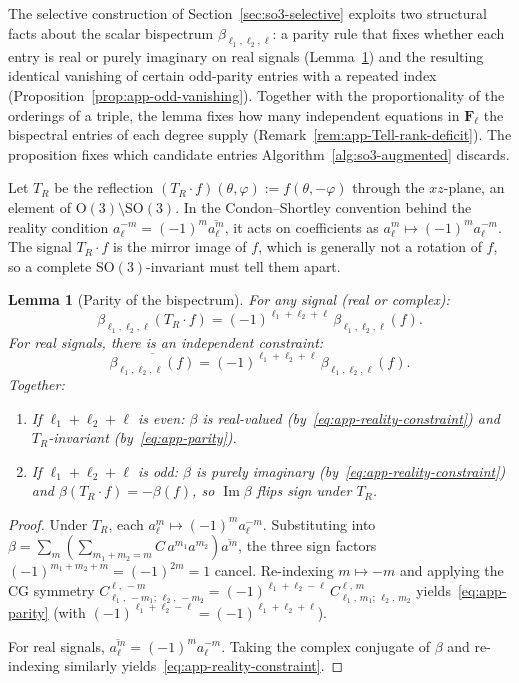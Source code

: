 \documentclass{article}
\newtheorem{lemma}[theorem]{Lemma}
\theoremstyle{definition}
\theoremstyle{remark}
\DeclareMathOperator{\im}{Im}
\newcommand{\SO}{\mathrm{SO}}
\newcommand{\CG}[6]{C^{#5,\,#6}_{#1,\,#2;\,#3,\,#4}}
\newcommand{\conj}[1]{\overline{#1}}
\theoremstyle{definition}
\begin{document}
The selective construction of Section~\ref{sec:so3-selective}
exploits two structural facts about the scalar bispectrum
$\beta_{\ell_1,\ell_2,\ell}$: a parity rule that fixes whether each
entry is real or purely imaginary on real signals (Lemma~\ref{lem:app-parity})
and the resulting identical vanishing of certain odd-parity entries
with a repeated index (Proposition~\ref{prop:app-odd-vanishing}). Together with the
proportionality of the orderings of a triple, the lemma fixes how many independent equations
in $\mathbf{F}_\ell$ the bispectral entries of each degree supply (Remark~\ref{rem:app-Tell-rank-deficit}). The
proposition fixes which candidate entries Algorithm~\ref{alg:so3-augmented} discards.

Let $T_R$ be the reflection $(T_R\cdot f)(\theta,\varphi) :=
f(\theta,-\varphi)$ through the $xz$-plane, an element of
$\mathrm{O}(3)\setminus\SO(3)$. In the Condon--Shortley convention
behind the reality condition
$a_\ell^{-m}=(-1)^m\conj{a_\ell^m}$, it acts on coefficients as
$a_\ell^m\mapsto(-1)^m a_\ell^{-m}$. The signal $T_R\cdot f$ is the mirror image of $f$, which is
generally not a rotation of $f$, so a complete $\SO(3)$-invariant must tell them apart.

\begin{lemma}[Parity of the bispectrum]\label{lem:app-parity}
For any signal (real or complex):
\begin{equation}\label{eq:app-parity}
  \beta_{\ell_1,\ell_2,\ell}(T_R \cdot f)
  = (-1)^{\ell_1+\ell_2+\ell}\,\beta_{\ell_1,\ell_2,\ell}(f).
\end{equation}
For \emph{real} signals, there is an independent constraint:
\begin{equation}\label{eq:app-reality-constraint}
  \conj{\beta_{\ell_1,\ell_2,\ell}(f)}
  = (-1)^{\ell_1+\ell_2+\ell}\,\beta_{\ell_1,\ell_2,\ell}(f).
\end{equation}
Together:
\begin{enumerate}[nosep,label=(\alph*)]
\item If $\ell_1+\ell_2+\ell$ is even:
  $\beta$ is real-valued (by~\eqref{eq:app-reality-constraint})
  and $T_R$-invariant (by~\eqref{eq:app-parity}).
\item If $\ell_1+\ell_2+\ell$ is odd:
  $\beta$ is purely imaginary (by~\eqref{eq:app-reality-constraint})
  and $\beta(T_R \cdot f) = -\beta(f)$, so $\im\beta$ flips sign under $T_R$.
\end{enumerate}
\end{lemma}
\begin{proof}
Under $T_R$, each $a_\ell^m \mapsto (-1)^m a_\ell^{-m}$.
Substituting into $\beta = \sum_m (\sum_{m_1+m_2=m} C\, a^{m_1} a^{m_2})
\conj{a^m}$, the three sign factors $(-1)^{m_1+m_2+m} = (-1)^{2m} = 1$
cancel. Re-indexing $m \mapsto -m$ and applying the CG symmetry
$\CG{\ell_1}{-m_1}{\ell_2}{-m_2}{\ell}{-m}
  = (-1)^{\ell_1+\ell_2-\ell}\,\CG{\ell_1}{m_1}{\ell_2}{m_2}{\ell}{m}$
yields~\eqref{eq:app-parity} (with $(-1)^{\ell_1+\ell_2-\ell} = (-1)^{\ell_1+\ell_2+\ell}$).

For real signals, $\conj{a_\ell^m} = (-1)^m a_\ell^{-m}$.
Taking the complex conjugate of $\beta$ and re-indexing similarly
yields~\eqref{eq:app-reality-constraint}.
\end{proof}
\end{document}
